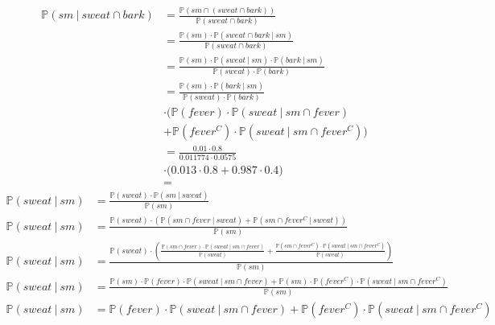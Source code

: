 \documentclass[a4paper]{scrartcl}
\newcommand{\prob}{\mathbb{P}}
\begin{document}
\begin{equation*}
    \begin{split}
        \prob(sm\ |\ sweat \cap bark)
        &= \frac{\prob(sm \cap (sweat \cap bark))}
                {\prob(sweat \cap bark)} \\
        &= \frac{\prob(sm) \cdot \prob(sweat \cap bark\ |\ sm)}
                {\prob(sweat \cap bark)} \\
        &= \frac{\prob(sm) \cdot \prob(sweat\ |\ sm) \cdot \prob(bark\ |\ sm)}
                {\prob(sweat) \cdot \prob(bark)} \\
        &= \frac{\prob(sm) \cdot \prob(bark\ |\ sm)}{\prob(sweat) \cdot \prob(bark)} \\
        &\cdot \Big( \prob(fever) \cdot \prob(sweat\ |\ sm \cap fever) \\
        &+ \prob(fever^C) \cdot \prob(sweat\ |\ sm \cap fever^C) \Big) \\
        &= \frac{\num{0,01} \cdot \num{0,8}}{\num{0.011774} \cdot \num{0,0575}} \\
        &\cdot \Big( \num{0,013} \cdot \num{0,8} + \num{0,987} \cdot \num{0,4} \Big) \\
        &= 
    \end{split}
\end{equation*}
\begin{equation*}
    \begin{split}
        \prob(sweat\ |\ sm) &= \frac{\prob(sweat) \cdot \prob(sm\ |\ sweat)}{\prob(sm)} \\
        \prob(sweat\ |\ sm) &= \frac{\prob(sweat) \cdot (\prob(sm \cap fever\ |\ sweat) + \prob(sm \cap fever^C\ |\ sweat))}{\prob(sm)} \\
        \prob(sweat\ |\ sm) &= \frac{\prob(sweat) \cdot (\frac{\prob(sm \cap fever) \cdot \prob(sweat\ |\ sm \cap fever)}{\prob(sweat)} + \frac{\prob(sm \cap fever^C) \cdot \prob(sweat\ |\ sm \cap fever^C)}{\prob(sweat)})}{\prob(sm)} \\
        \prob(sweat\ |\ sm) &= \frac{\prob(sm) \cdot \prob(fever) \cdot \prob(sweat\ |\ sm \cap fever) + \prob(sm) \cdot \prob(fever^C) \cdot \prob(sweat\ |\ sm \cap fever^C)}{\prob(sm)} \\
        \prob(sweat\ |\ sm) &= \prob(fever) \cdot \prob(sweat\ |\ sm \cap fever) + \prob(fever^C) \cdot \prob(sweat\ |\ sm \cap fever^C) \\
    \end{split}
\end{equation*}
\end{document}
